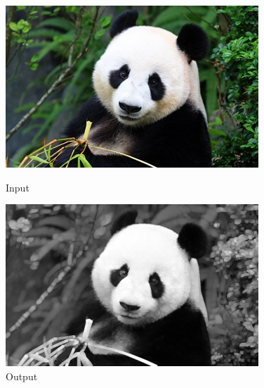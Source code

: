 \documentclass[a4paper,8pt]{article}
\begin{document}
        \begin{figure}[H]
        \centering
        \begin{minipage}{0.4\linewidth}
        \centering
        \includegraphics[width=\linewidth]{output/input1.jpg}
        \caption{Input}
        \end{minipage}
        \hfill
        \begin{minipage}{0.4\linewidth}
        \centering
        \includegraphics[width=\linewidth]{output/Max Filter_output.png}
        \caption{Output}
        \end{minipage}
        \end{figure}
        \clearpage
        
\end{document}

